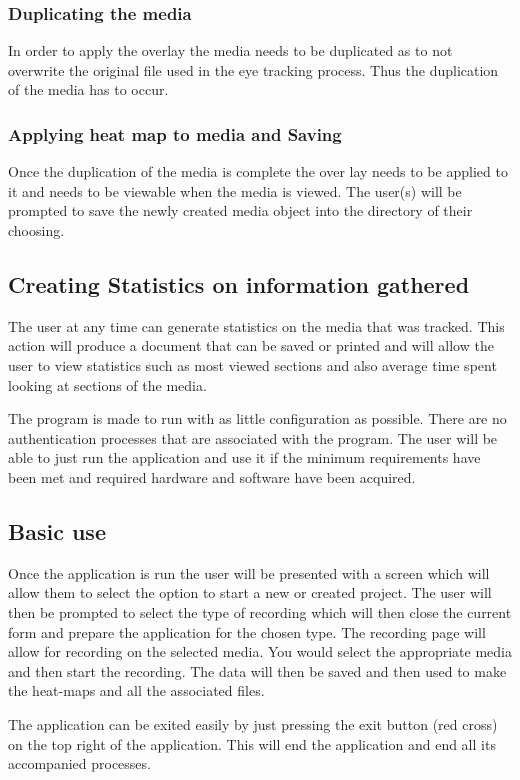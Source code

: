 \subsubsection{Duplicating the media}
In order to apply the overlay the media needs to be duplicated as to not overwrite the original file used in the eye tracking process. Thus the duplication of the media has to occur.

\subsubsection{Applying heat map to media and Saving}
Once the duplication of the media is complete the over lay needs to be applied to it and needs to be viewable when the media is viewed. The user(s) will be prompted to save the newly created media object into the directory of their choosing.

\subsection{Creating Statistics on information gathered}
The user at any time can generate statistics on the  media that was tracked. This action will produce a document that can be saved or printed and will allow the user to view statistics such as most viewed sections and also average time spent looking at sections of the media.
\fi

The program is made to run with as little configuration as possible. There are no authentication processes that are associated with the program. The user will be able to just run the application and use it if the minimum requirements have been met and required hardware and software have been acquired.

\subsection{Basic use}
Once the application is run the user will be presented with a screen which will allow them to select the option to start a new or created project. The user will then be prompted to select the type of recording which will then close the current form and prepare the application for the chosen type. The recording page will allow for recording on the selected media. You would select the appropriate media and then start the recording. The data will then be saved and then used to make the heat-maps and all the associated files.\newline

The application can be exited easily by just pressing the exit button (red cross) on the top right of the application. This will end the application and end all its accompanied processes.



